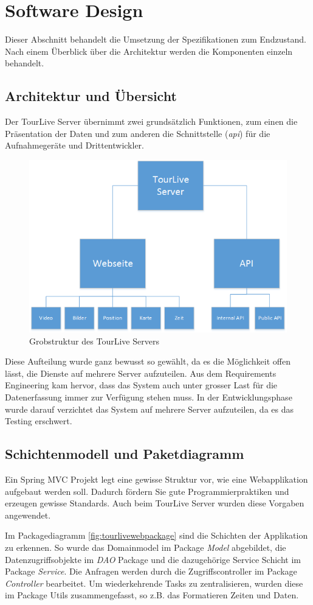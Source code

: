 \section{Software Design}
Dieser Abschnitt behandelt die Umsetzung der Spezifikationen zum Endzustand. Nach einem Überblick über die Architektur werden die Komponenten einzeln behandelt.

\subsection{Architektur und Übersicht}
Der TourLive Server übernimmt zwei grundsätzlich Funktionen, zum einen die Präsentation der Daten und zum anderen die Schnittstelle (\textit{\gls{api}}) für die Aufnahmegeräte und Drittentwickler.
\begin{figure}[H]
	\centering
	\includegraphics[width=120mm]{images/tourliveweb/uebersicht_tourlive.png}
	\caption{Grobstruktur des TourLive Servers}
	\label{fig:grobstrukturtourliveserver}
\end{figure}
Diese Aufteilung wurde ganz bewusst so gewählt, da es die Möglichkeit offen lässt, die Dienste auf mehrere Server aufzuteilen. Aus dem Requirements Engineering kam hervor, dass das System auch unter grosser Last für die Datenerfassung immer zur Verfügung stehen muss. In der Entwicklungsphase wurde darauf verzichtet das System auf mehrere Server aufzuteilen, da es das Testing erschwert.

\subsection{Schichtenmodell und Paketdiagramm}
Ein Spring MVC Projekt legt eine gewisse Struktur vor, wie eine Webapplikation aufgebaut werden soll. Dadurch fördern Sie gute Programmierpraktiken und erzeugen gewisse Standards. Auch beim TourLive Server wurden diese Vorgaben angewendet.
\\
\label{fig:tourlivewebpackage}

Im Packagediagramm \ref{fig:tourlivewebpackage} sind die Schichten der Applikation zu erkennen. So wurde das Domainmodel im Package \textit{Model} abgebildet, die Datenzugriffsobjekte im \textit{DAO} Package und die dazugehörige Service Schicht im Package \textit{Service}. Die Anfragen werden durch die Zugriffscontroller im Package \textit{Controller} bearbeitet. Um wiederkehrende Tasks zu zentralisieren, wurden diese im Package Utils zusammengefasst, so z.B. das Formatieren Zeiten und Daten.


